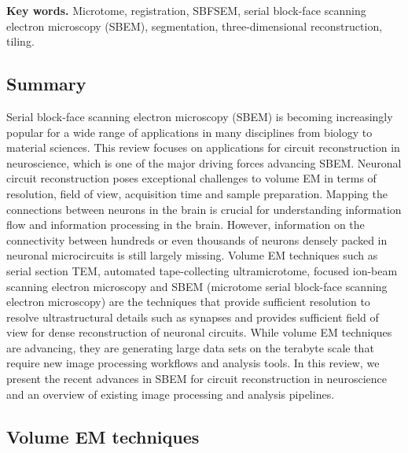 \documentclass{article}
\begin{document}
\noindent\textbf{Key words.} Microtome, registration, SBFSEM, serial block-face scanning electron microscopy (SBEM), segmentation, three-dimensional reconstruction, tiling.

\subsection*{Summary}

Serial block-face scanning electron microscopy (SBEM) is becoming increasingly popular for a wide range of applications in many disciplines from biology to material sciences. This review focuses on applications for circuit reconstruction in neuroscience, which is one of the major driving forces advancing SBEM. Neuronal circuit reconstruction poses exceptional challenges to volume EM in terms of resolution, field of view, acquisition time and sample preparation. Mapping the connections between neurons in the brain is crucial for understanding information flow and information processing in the brain. However, information on the connectivity between hundreds or even thousands of neurons densely packed in neuronal microcircuits is still largely missing. Volume EM techniques such as serial section TEM, automated tape-collecting ultramicrotome, focused ion-beam scanning electron microscopy and SBEM (microtome serial block-face scanning electron microscopy) are the techniques that provide sufficient resolution to resolve ultrastructural details such as synapses and provides sufficient field of view for dense reconstruction of neuronal circuits. While volume EM techniques are advancing, they are generating large data sets on the terabyte scale that require new image processing workflows and analysis tools. In this review, we present the recent advances in SBEM for circuit reconstruction in neuroscience and an overview of existing image processing and analysis pipelines.

\subsection*{Volume EM techniques}
\end{document}

